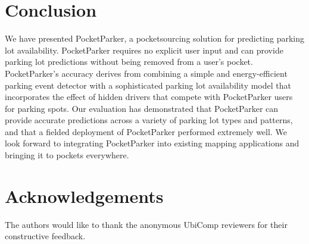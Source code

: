 \documentclass{sigchi}
\begin{document}

\vspace*{-0.05in}
\section{Conclusion}

We have presented PocketParker, a pocketsourcing solution for predicting
parking lot availability. PocketParker requires no explicit user input and
can provide parking lot predictions without being removed from a user's
pocket. PocketParker's accuracy derives from combining a simple and
energy-efficient parking event detector with a sophisticated parking lot
availability model that incorporates the effect of hidden drivers that
compete with PocketParker users for parking spots. Our evaluation has
demonstrated that PocketParker can provide accurate predictions across a
variety of parking lot types and patterns, and that a fielded deployment of
PocketParker performed extremely well. We look forward to integrating
PocketParker into existing mapping applications and bringing it to pockets
everywhere.

\vspace*{-0.05in}
\section*{Acknowledgements}

The authors would like to thank the anonymous UbiComp reviewers for their
constructive feedback.


\clearpage
\end{document}
